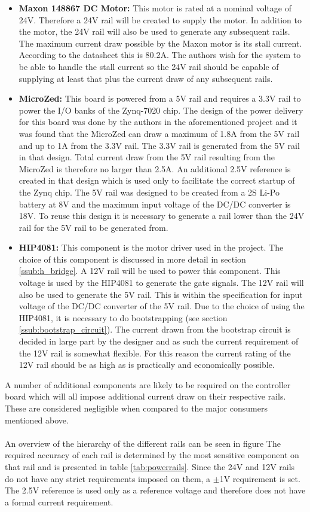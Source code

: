 \begin{itemize}
	\item \textbf{Maxon 148867 DC Motor:} This motor is rated at a nominal voltage of 24V.
	Therefore a 24V rail will be created to supply the motor.
	In addition to the motor, the 24V rail will also be used to generate any subsequent rails.
	The maximum current draw possible by the Maxon motor is its stall current. 
	According to the datasheet this is 80.2A.
	The authors wish for the system to be able to handle the stall current so the 24V rail should be capable of supplying at least that plus the current draw of any subsequent rails.
	\item  \textbf{MicroZed:} This board is powered from a 5V rail and requires a 3.3V rail to power the I/O banks of the Zynq-7020 chip.
	The design of the power delivery for this board was done by the authors in the aforementioned project \cite{isaswarm} and it was found that the MicroZed can draw a maximum of 1.8A from the 5V rail and up to 1A from the 3.3V rail.
	The 3.3V rail is generated from the 5V rail in that design.
	Total current draw from the 5V rail resulting from the MicroZed is therefore no larger than 2.5A.
	An additional 2.5V reference is created in that design which is used only to facilitate the correct startup of the Zynq chip.
	The 5V rail was designed to be created from a 2S Li-Po battery at 8V and the maximum input voltage of the DC/DC converter is 18V.
	To reuse this design it is necessary to generate a rail lower than the 24V rail for the 5V rail to be generated from.
	\item \textbf{HIP4081:} This component is the motor driver used in the project.
	The choice of this component is discussed in more detail in section \ref{ssub:h_bridge}.
	A 12V rail will be used to power this component. 
	This voltage is used by the HIP4081 to generate the gate signals.
	The 12V rail will also be used to generate the 5V rail.
	This is within the specification for input voltage of the DC/DC converter of the 5V rail. 
	Due to the choice of using the HIP4081, it is necessary to do bootstrapping (see section \ref{ssub:bootstrap_circuit}). 
	The current drawn from the bootstrap circuit is decided in large part by the designer and as such the current requirement of the 12V rail is somewhat flexible.
	For this reason the current rating of the 12V rail should be as high as is practically and economically possible.
\end{itemize}
A number of additional components are likely to be required on the controller board which will all impose additional current draw on their respective rails.
These are considered negligible when compared to the major consumers mentioned above.
\\~\\
An overview of the hierarchy of the different rails can be seen in figure
The required accuracy of each rail is determined by the most sensitive component on that rail and is presented in table \ref{tab:powerrails}.
Since the 24V and 12V rails do not have any strict requirements imposed on them, a $\pm$1V requirement is set. 
The 2.5V reference is used only as a reference voltage and therefore does not have a formal current requirement.

